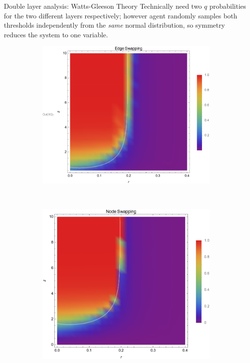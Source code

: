 \documentclass[10pt, xcolor=dvipsnames, handout]{beamer}
\begin{document}
\begin{frame}{Double layer analysis: Watts-Gleeson Theory}
Technically need two $q$ probabilities for the two different layers respectively; however agent randomly samples both thresholds independently from the \emph{same} normal distribution, so symmetry reduces the system to one variable.

\begin{figure}
    \centering
    \begin{subfigure}[b]{0.435\textwidth}
        \includegraphics[width=\textwidth]{figures/edge_swap_zr}
    \end{subfigure}
    ~ %
    \begin{subfigure}[b]{0.4\textwidth}
        \includegraphics[width=\textwidth]{figures/node_swap_zr}

\end{subfigure}
\end{figure}
\end{frame}
\end{document}
